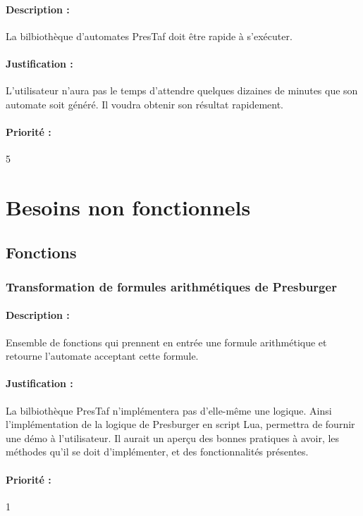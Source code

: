 \documentclass{article}%
\begin{document}
\paragraph{Description :} La bilbiothèque d'automates PresTaf doit être rapide à s'exécuter.

\paragraph{Justification :} L'utilisateur n'aura pas le temps d'attendre quelques dizaines de minutes que son automate soit généré. Il voudra obtenir son résultat rapidement.

\paragraph{Priorité :} 5

\section{Besoins non fonctionnels}

\subsection{Fonctions}

\subsubsection{Transformation de formules arithmétiques de Presburger}

\paragraph{Description :} Ensemble de fonctions qui prennent en entrée une formule arithmétique et retourne l'automate acceptant cette formule.

\paragraph{Justification :} La bilbiothèque PresTaf n'implémentera pas d'elle-même une logique. Ainsi l'implémentation de la logique de Presburger en script Lua, permettra de fournir une démo à l'utilisateur. Il aurait un aperçu des bonnes pratiques à avoir, les méthodes qu'il se doit d'implémenter, et des fonctionnalités présentes.

\paragraph{Priorité :} 1\\
\end{document}
